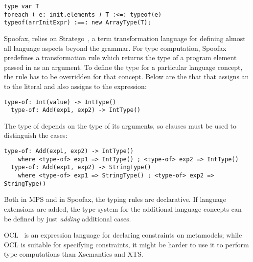 \begin{lstlisting}[language=MPS]
type var T
foreach ( e: init.elements ) T :<=: typeof(e)
typeof(arrInitExpr) :==: new ArrayType(T);
\end{lstlisting}


Spoofax, relies on Stratego~\cite{Stratego2008}, a term transformation language
for defining almost all language aspects beyond the grammar. For type computation,
Spoofax predefines a transformation rule  which returns the type of
a program element passed in as an argument. To define the type for a
particular language concept, the  rule has to be overridden for that
concept. Below are the that that assigns an  to the
 literal and also assigns  to the  expression:

\begin{lstlisting}[language=Spoofax]
  type-of: Int(value) -> IntType()
  type-of: Add(exp1, exp2) -> IntType()
\end{lstlisting}

The type of  depends on the type of its arguments, so  clauses
must be used to distinguish the cases:

\begin{lstlisting}[language=Spoofax]
  type-of: Add(exp1, exp2) -> IntType()
    where <type-of> exp1 => IntType() ; <type-of> exp2 => IntType()
  type-of: Add(exp1, exp2) -> StringType()
    where <type-of> exp1 => StringType() ; <type-of> exp2 => StringType()
\end{lstlisting}

Both in MPS and in Spoofax, the typing rules are declarative. If language
extensions are added, the type system for the additional language concepts can be defined by
just \emph{adding} additional cases.










OCL~\cite{WarmerKleppe99,OCLOMG} is an expression language for declaring
constraints on metamodels; while OCL is suitable for specifying constraints, it
might be harder to use it to perform type computations than Xsemantics and XTS.

